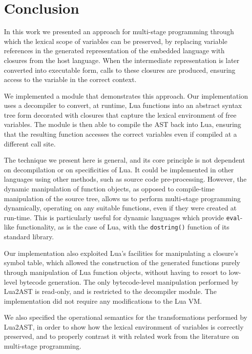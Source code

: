 \documentclass[english]{llncs}
\begin{document}
\section{Conclusion}
\label{sec:conclusion}

In this work we presented an approach for multi-stage programming through
which the lexical scope of variables can be preserved, by replacing
variable references in the generated representation of the embedded language
with closures from the host language. When the intermediate representation
is later converted into executable form, calls to these closures are
produced, ensuring access to the variable in the correct context.

We implemented a module that demonstrates this approach.
Our implementation uses a decompiler to convert, at runtime, Lua
functions into an abstract syntax tree form decorated with
closures that capture the lexical environment of free variables.
The module is then able to compile the AST back into Lua,
ensuring that the resulting function accesses the correct variables
even if compiled at a different call site.

The technique we present here is general, and its core principle
is not dependent on decompilation or on specificities of Lua.
It could be implemented in other languages using other methods,
such as source code pre-processing. However, the dynamic manipulation
of function objects, as opposed to compile-time manipulation of the
source tree, allows us to perform multi-stage programming dynamically,
operating on any suitable functions, even if they were created at run-time.
This is particularly useful for dynamic languages which provide
\texttt{eval}-like functionality, as is the case of Lua, with
the \texttt{dostring()} function of its standard library.

Our implementation also exploited Lua's facilities for manipulating
a closure's symbol table, which allowed the construction of the
generated functions purely through manipulation of Lua function
objects, without having to resort to low-level bytecode generation.
The only bytecode-level manipulation performed by Lua2AST is
read-only, and is restricted to the decompiler module. The
implementation did not require any modifications to the Lua VM.

We also specified the operational semantics for the transformations
performed by Lua2AST, in order to show how the lexical environment
of variables is correctly preserved, and to properly contrast it with
related work from the literature on multi-stage programming.
\end{document}
